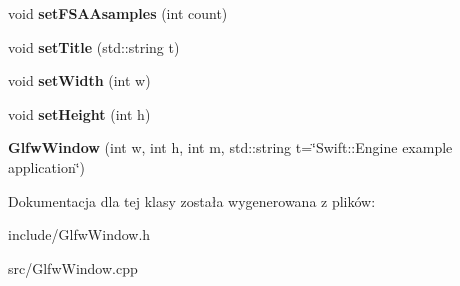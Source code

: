 \begin{DoxyCompactItemize}
\item 
\hypertarget{class_swift_1_1_glfw_window_a2804a109453b35535e6406f3a1fbed8a}{void {\bfseries set\-F\-S\-A\-Asamples} (int count)}\label{class_swift_1_1_glfw_window_a2804a109453b35535e6406f3a1fbed8a}

\item 
\hypertarget{class_swift_1_1_glfw_window_aaedfd8e1dcdfcff6aa83af2d29603a64}{void {\bfseries set\-Title} (std\-::string t)}\label{class_swift_1_1_glfw_window_aaedfd8e1dcdfcff6aa83af2d29603a64}

\item 
\hypertarget{class_swift_1_1_glfw_window_a7190075f5f829fc42bc4ed3f23feccad}{void {\bfseries set\-Width} (int w)}\label{class_swift_1_1_glfw_window_a7190075f5f829fc42bc4ed3f23feccad}

\item 
\hypertarget{class_swift_1_1_glfw_window_a1b9659f332299689e3b6097ec36bf911}{void {\bfseries set\-Height} (int h)}\label{class_swift_1_1_glfw_window_a1b9659f332299689e3b6097ec36bf911}

\item 
\hypertarget{class_swift_1_1_glfw_window_a809d12ff5711c10bd12ccb5ca067eef7}{{\bfseries Glfw\-Window} (int w, int h, int m, std\-::string t=\char`\"{}Swift\-::\-Engine example application\char`\"{})}\label{class_swift_1_1_glfw_window_a809d12ff5711c10bd12ccb5ca067eef7}

\end{DoxyCompactItemize}


Dokumentacja dla tej klasy została wygenerowana z plików\-:\begin{DoxyCompactItemize}
\item 
include/Glfw\-Window.\-h\item 
src/Glfw\-Window.\-cpp\end{DoxyCompactItemize}
